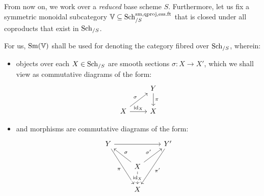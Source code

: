                 \begin{convention}
                    From now on, we work over a \textit{reduced} base scheme $S$. Furthermore, let us fix a symmetric monoidal subcategory $\mathbb{V} \subseteq \mathrm{Sch}_{/S}^{\mathrm{sm}, \mathrm{qproj}, \mathrm{ess}.\mathrm{ft}}$ that is closed under all coproducts that exist in $\mathrm{Sch}_{/S}$. 
                \end{convention}
                
                \begin{definition} \label{def: category_of_smooth_sections}
                    For us, $\mathrm{Sm}(\mathbb{V})$ shall be used for denoting the category fibred over $\mathrm{Sch}_{/S}$, wherein:
                        \begin{itemize}
                            \item objects over each $X \in \mathrm{Sch}_{/S}$ are smooth sections $\sigma: X \to X'$, which we shall view as commutative diagrams of the form:
                                $$
                                    \begin{tikzcd}
                                    	& {Y} \\
                                    	X & X
                                    	\arrow["\pi", from=1-2, to=2-2]
                                    	\arrow["{\sigma}", from=2-1, to=1-2]
                                    	\arrow["{\id_X}", from=2-1, to=2-2]
                                    \end{tikzcd}
                                $$
                            \item and morphisms are commutative diagrams of the form:
                                $$
                                    \begin{tikzcd}
                                    	Y && {Y'} \\
                                    	& X \\
                                    	& X
                                    	\arrow["\pi"', from=1-1, to=3-2]
                                    	\arrow["\sigma"', from=2-2, to=1-1]
                                    	\arrow["{\id_X}"{description}, from=2-2, to=3-2]
                                    	\arrow[from=1-1, to=1-3]
                                    	\arrow["{\sigma'}", from=2-2, to=1-3]
                                    	\arrow["{\pi'}", from=1-3, to=3-2]
                                    \end{tikzcd}
                                $$
                        \end{itemize}
                \end{definition}
        
